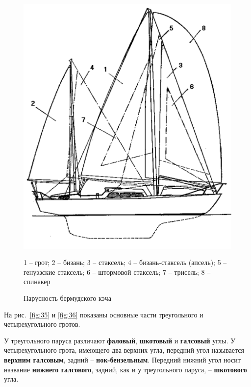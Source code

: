 \documentclass[a4paper, 12pt, twoside, final]{scrbook}
\begin{document}
\begin{figure}[htbp]
\begin{centering}
\includegraphics{Parusnost_bermudskogo_kecha}
\par\end{centering}

\protect\caption{\label{fig:34}Парусность
бермудского кэча}


\centering{}\small 1 \--- грот; 2 \--- бизань; 3 \--- стаксель; 4 \--- бизань-стаксель (апсель);
5 \--- генуэзские стаксель; 6 \--- штормовой стаксель; 7 \--- трисель; 8 \--- спинакер
\end{figure}


На рис.~\ref{fig:35} и \ref{fig:36} показаны основные части треугольного и четырехугольного гротов.

У треугольного паруса различают \textbf{фаловый}, \textbf{шкотовый}
и \textbf{галсовый} углы. У четырехугольного грота, имеющего два верхних
угла, передний угол называется \textbf{верхним галсовым}, задний \---
\textbf{нок-бензельным}. Передний нижний угол носит название \textbf{нижнего галсового}, задний, как и у треугольного паруса, \--- \textbf{шкотового}
угла.
\end{document}
